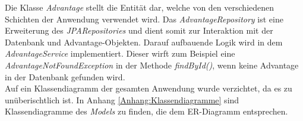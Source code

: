 Die Klasse \textit{Advantage} stellt die Entität dar, welche von den verschiedenen Schichten der Anwendung verwendet wird.
Das \textit{AdvantageRepository} ist eine Erweiterung des \textit{JPARepositories} und dient somit zur Interaktion mit der Datenbank und Advantage-Objekten.
Darauf aufbauende Logik wird in dem \textit{AdvantageService} implementiert. Dieser wirft zum Beispiel eine \textit{AdvantageNotFoundException} in der
Methode \textit{findById()}, wenn keine Advantage in der Datenbank gefunden wird.
\\
Auf ein Klassendiagramm der gesamten Anwendung wurde verzichtet, da es zu unüberischtlich ist.
In Anhang \ref{Anhang:Klassendiagramme} sind Klassendiagramme des \textit{Models} zu finden, die dem ER-Diagramm entsprechen.



